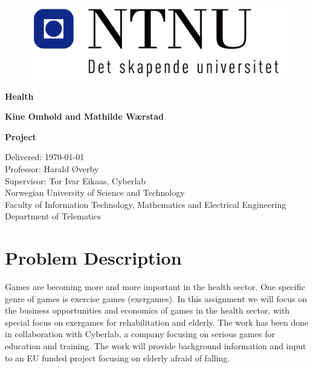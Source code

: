 \documentclass[b5paper,twoside,openright,11pt]{report}
\begin{document}
\begin{flushleft}
\begin{figure}[htb]
\includegraphics[scale=0.6]{NTNU-logo}
\end{figure}
\bigskip
\bigskip
\bigskip
\bigskip
\begin{huge}
\textbf{Health}\\
\end{huge} 
\bigskip
\bigskip
\bigskip
\bigskip
\bigskip
\bigskip
\bigskip
\bigskip
\bigskip
\begin{Large}
\textbf{Kine Omhold and Mathilde Wærstad}
\end{Large}
\bigskip
\bigskip
\bigskip
\bigskip
\bigskip
\bigskip
\bigskip
\bigskip
\bigskip
\bigskip
\bigskip
\bigskip
\bigskip
\bigskip
\begin{large}
\textbf{Project\\}
\end{large}
Delivered: \today\\
Professor: Harald Øverby\\
Supervisor: Tor Ivar Eikaas, Cyberlab\\
\bigskip
\bigskip
\bigskip
\bigskip
\bigskip
Norwegian University of Science and Technology\\ 
Faculty of Information Technology, Mathematics and Electrical Engineering\\
Department of Telematics
\end{flushleft}
\chapter*{Problem Description} 
Games are becoming more and more important in the health sector. One specific genre of games is exercise games (exergames). In this assignment we will focus on the business opportunities and economics of games in the health sector, with special focus on exergames for rehabilitation and elderly. The work has been done in collaboration with Cyberlab, a company focusing on serious games for education and training. The work will provide background information and input to an EU funded project focusing on elderly afraid of falling.
\end{document}
